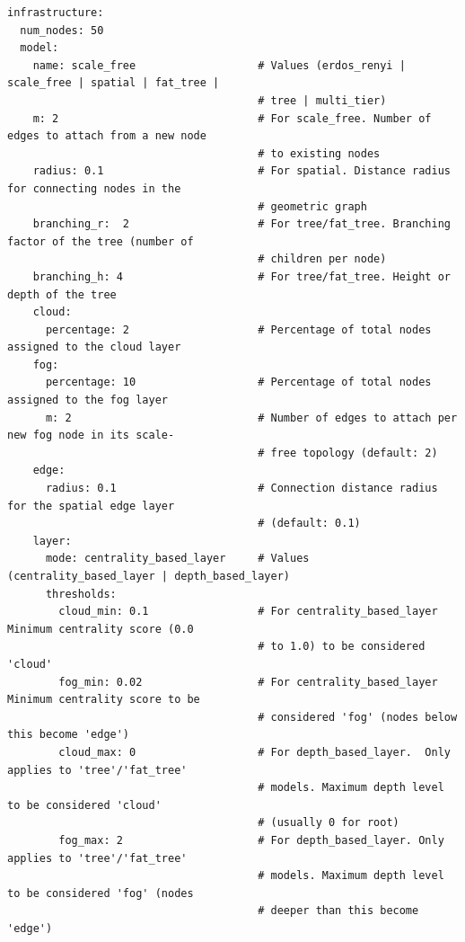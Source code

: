 \documentclass[ASNA]{USG} %
\begin{document}
\begin{lstlisting}[caption={YAML configuration for infrastructure definition.},label=lst:user_event, basicstyle=\fontsize{8}{10}\selectfont\ttfamily]
infrastructure:
  num_nodes: 50
  model:
    name: scale_free                   # Values (erdos_renyi | scale_free | spatial | fat_tree | 
                                       # tree | multi_tier)
    m: 2                               # For scale_free. Number of edges to attach from a new node
                                       # to existing nodes
    radius: 0.1                        # For spatial. Distance radius for connecting nodes in the
                                       # geometric graph
    branching_r:  2                    # For tree/fat_tree. Branching factor of the tree (number of
                                       # children per node)
    branching_h: 4                     # For tree/fat_tree. Height or depth of the tree
    cloud:
      percentage: 2                    # Percentage of total nodes assigned to the cloud layer
    fog:
      percentage: 10                   # Percentage of total nodes assigned to the fog layer
      m: 2                             # Number of edges to attach per new fog node in its scale-
                                       # free topology (default: 2)
    edge:
      radius: 0.1                      # Connection distance radius for the spatial edge layer 
                                       # (default: 0.1)
    layer:
      mode: centrality_based_layer     # Values (centrality_based_layer | depth_based_layer)
      thresholds:
        cloud_min: 0.1                 # For centrality_based_layer Minimum centrality score (0.0 
                                       # to 1.0) to be considered 'cloud'
        fog_min: 0.02                  # For centrality_based_layer Minimum centrality score to be 
                                       # considered 'fog' (nodes below this become 'edge')
        cloud_max: 0                   # For depth_based_layer.  Only applies to 'tree'/'fat_tree' 
                                       # models. Maximum depth level to be considered 'cloud' 
                                       # (usually 0 for root)
        fog_max: 2                     # For depth_based_layer. Only applies to 'tree'/'fat_tree' 
                                       # models. Maximum depth level to be considered 'fog' (nodes 
                                       # deeper than this become 'edge')
\end{lstlisting}
\end{document}
